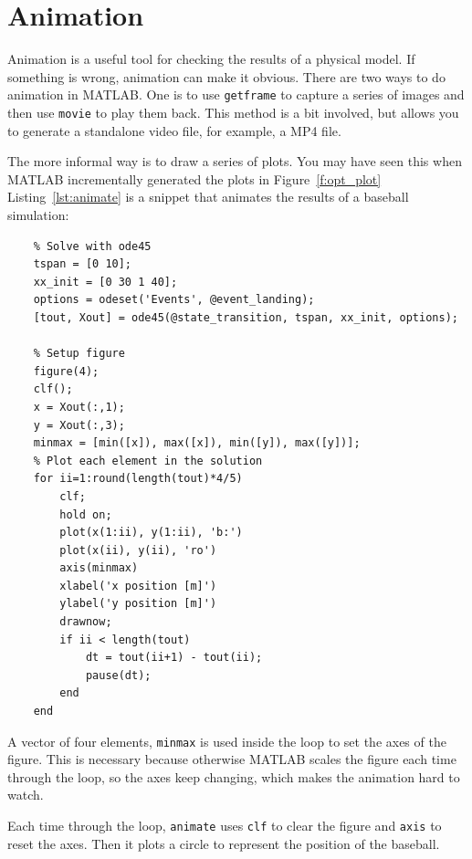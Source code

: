\clearpage

\section{Animation}

Animation is a useful tool for checking the results of a physical model. If something is wrong, animation can make it obvious. There are two ways to do animation in MATLAB. One is to use \lstinline{getframe} to capture a series of images and then use \lstinline{movie} to play them back.  This method is a bit involved, but allows you to generate a standalone video file, for example, a MP4 file.


The more informal way is to draw a series of plots.  You may have seen this when MATLAB incrementally generated the plots in Figure~\ref{f:opt_plot}  Listing~\ref{lst:animate} is a snippet that animates the results of a baseball simulation:

\begin{lstlisting}[caption={A snippet that animates the results of a baseball simulation}, label={lst:animate}]
    % Animate
    % Solve with ode45
    tspan = [0 10];
    xx_init = [0 30 1 40];
    options = odeset('Events', @event_landing);
    [tout, Xout] = ode45(@state_transition, tspan, xx_init, options);
    
    % Setup figure
    figure(4);
    clf();
    x = Xout(:,1);
    y = Xout(:,3);
    minmax = [min([x]), max([x]), min([y]), max([y])];
    % Plot each element in the solution
    for ii=1:round(length(tout)*4/5)
        clf; 
        hold on;
        plot(x(1:ii), y(1:ii), 'b:')
        plot(x(ii), y(ii), 'ro')
        axis(minmax)
        xlabel('x position [m]')
        ylabel('y position [m]')
        drawnow;
        if ii < length(tout)
            dt = tout(ii+1) - tout(ii);
            pause(dt);
        end
    end
\end{lstlisting}

A vector of four elements, \lstinline{minmax} is used inside the loop to set the axes of the figure.
This is necessary because otherwise MATLAB scales the figure each time through the loop,
so the axes keep changing, which makes the animation hard to watch.


Each time through the loop, \lstinline{animate} uses \lstinline{clf}
to clear the figure and \lstinline{axis} to reset the axes.  Then it plots a circle to represent the position of the \mbox{baseball}.

